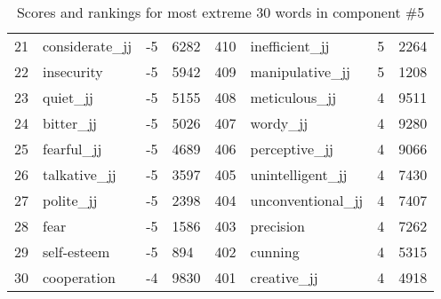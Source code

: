 \begin{table}[tbp]
\begin{tabular}{| rlr@{.}l | rlr@{.}l |}
    21 & considerate\_jj & -5 & 6282    &    410 & inefficient\_jj & 5 & 2264 \\
    22 & insecurity & -5 & 5942    &    409 & manipulative\_jj & 5 & 1208 \\
    23 & quiet\_jj & -5 & 5155    &    408 & meticulous\_jj & 4 & 9511 \\
    24 & bitter\_jj & -5 & 5026    &    407 & wordy\_jj & 4 & 9280 \\
    25 & fearful\_jj & -5 & 4689    &    406 & perceptive\_jj & 4 & 9066 \\
    26 & talkative\_jj & -5 & 3597    &    405 & unintelligent\_jj & 4 & 7430 \\
    27 & polite\_jj & -5 & 2398    &    404 & unconventional\_jj & 4 & 7407 \\
    28 & fear & -5 & 1586    &    403 & precision & 4 & 7262 \\
    29 & self-esteem & -5 & 894    &    402 & cunning & 4 & 5315 \\
    30 & cooperation & -4 & 9830    &    401 & creative\_jj & 4 & 4918 \\
    \hline
    \end{tabular}
    \caption{Scores and rankings for most extreme 30 words in component \#5} 
\end{table}
\clearpage
